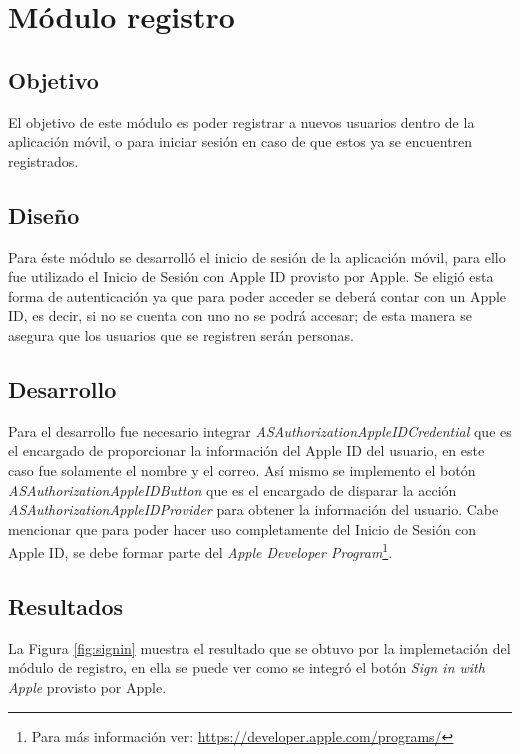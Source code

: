 \section{Módulo registro}

\subsection{Objetivo}
El objetivo de este módulo es poder registrar a nuevos usuarios dentro de la aplicación móvil, o para iniciar sesión en caso de que estos ya se encuentren registrados.

\subsection{Diseño}

Para éste módulo se desarrolló el inicio de sesión de la aplicación móvil, para ello fue utilizado el Inicio de Sesión con Apple ID provisto por Apple. Se eligió esta forma de autenticación ya que para poder acceder se deberá contar con un Apple ID, es decir, si no se cuenta con uno no se podrá accesar; de esta manera se asegura que los usuarios que se registren serán personas.

\subsection{Desarrollo}

Para el desarrollo fue necesario integrar \textit{ASAuthorizationAppleIDCredential} que es el encargado de proporcionar la información del Apple ID del usuario, en este caso fue solamente el nombre y el correo. Así mismo se implemento el botón \textit{ASAuthorizationAppleIDButton} que es el encargado de disparar la acción \textit{ASAuthorizationAppleIDProvider} para obtener la información del usuario. Cabe mencionar que para poder hacer uso completamente del Inicio de Sesión con Apple ID, se debe formar parte del \textit{Apple Developer Program}\footnote{Para más información ver: \url{https://developer.apple.com/programs/}}.


\subsection{Resultados}

La Figura \ref{fig:signin} muestra el resultado que se obtuvo por la implemetación del módulo de registro, en ella se puede ver como se integró el botón \textit{Sign in with Apple} provisto por Apple. \\

